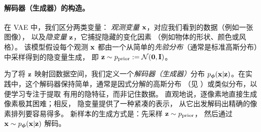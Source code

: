 \paragraph{解码器（生成器）的构造。}



在 VAE 中，我们区分两类变量：
\emph{观测变量} ${\mathbf{x}}$，对应我们看到的数据（例如一张图像），
以及\emph{隐变量} ${\mathbf{z}}$，它捕捉隐藏的变化因素
（例如物体的形状、颜色或风格）。
该模型假设每个观测 ${\mathbf{x}}$ 都由一个从简单的\emph{先验分布}（通常是标准高斯分布）中采样得到的隐变量生成，
即 ${\mathbf{z}} \sim p_{\text{prior}} := \mathcal{N}(\mathbf{0}, \mathbf{I})$。

为了将 ${\mathbf{z}}$ 映射回数据空间，我们定义一个\emph{解码器（生成器）}分布
$p_{\bm{\phi}}({\mathbf{x}}|{\mathbf{z}})$。在实践中，这个解码器保持简单，通常是因式分解的高斯分布
（见 ）或类似分布，以便学习专注于提取
有用的隐特征，而非记住数据。
直观地说，逐像素地直接生成像素极其困难；相反，
隐变量提供了一种紧凑的表示，
从它出发解码出精确的像素排列要容易得多。
新样本的生成方式是：先采样 ${\mathbf{z}} \sim p_{\text{prior}}$，
然后通过 ${\mathbf{x}} \sim p_{\bm{\phi}}({\mathbf{x}}|{\mathbf{z}})$ 解码。

